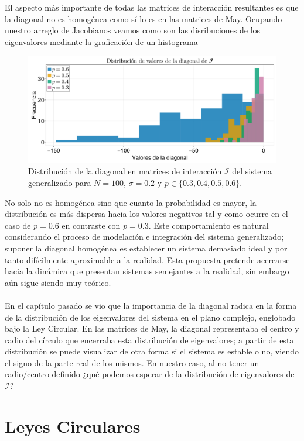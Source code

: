 El aspecto más importante de todas las matrices de interacción resultantes es que la diagonal no es homogénea como sí lo es en las matrices de May. Ocupando nuestro arreglo de Jacobianos veamos como son las disribuciones de los eigenvalores mediante la graficación de un histograma
\begin{figure}[h!]
	\centering
	\includegraphics[scale=0.16]{../Imagenes/DistDiagonal}
	\caption{Distribución de la diagonal en matrices de interacción $\mathcal{I}$ del sistema generalizado para $N=100$, $\sigma=0.2$ y $p\in\{0.3,0.4,0.5,0.6\}$.}
	\label{fig:DistDiagonal}
\end{figure}

No solo no es homogénea sino que cuanto la probabilidad es mayor, la distribución es más dispersa hacia los valores negativos tal y como ocurre en el caso de $p=0.6$ en contraste con $p=0.3$. Este comportamiento es natural considerando el proceso de modelación e integración del sistema generalizado; suponer la diagonal homogénea es establecer un sistema demasiado ideal y por tanto difícilmente aproximable a la realidad. Esta propuesta pretende acercarse hacia la dinámica que presentan sistemas semejantes a la realidad, sin embargo aún sigue siendo muy teórico. 
\\
\\
En el capítulo pasado se vio que la importancia de la diagonal radica en la forma de la distribución de los eigenvalores del sistema en el plano complejo, englobado bajo la Ley Circular. En las matrices de May, la diagonal representaba el centro y radio del círculo que encerraba esta distribución de eigenvalores; a partir de esta distribución se puede visualizar de otra forma si el sistema es estable o no, viendo el signo de la parte real de los mismos. En nuestro caso, al no tener un radio/centro definido ¿qué podemos esperar de la distribución de eigenvalores de $\mathcal{I}$?
\newpage

\section{Leyes Circulares}

